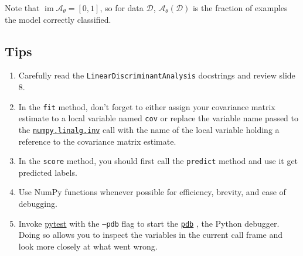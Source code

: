 \documentclass{article}
\numberwithin{equation}{section}
\newcommand{\pytest}{\href{https://docs.pytest.org/en/stable/}{pytest}}
\newcommand{\npinv}{%
    \href{%
        https://numpy.org/doc/stable/reference/generated/numpy.linalg.inv.html%
    }{\texttt{numpy.linalg.inv}}%
}
\newcommand{\pdb}{%
    \href{https://docs.python.org/3/library/pdb.html}{\texttt{pdb}}%
}
\begin{document}
Note that $ \operatorname{im}\mathcal{A}_\theta = [0, 1] $, so for
data $ \mathcal{D} $, $ \mathcal{A}_\theta(\mathcal{D}) $ is the
fraction of examples the model correctly classified.

\subsection{Tips}

\begin{enumerate}
    \item
    Carefully read the \texttt{LinearDiscriminantAnalysis} docstrings and
    review slide 8.

    \item
    In the \texttt{fit} method, don't forget to either assign your covariance
    matrix estimate to a local variable named \texttt{cov} or replace the
    variable name passed to the \npinv{} call with the name of the local
    variable holding a reference to the covariance matrix estimate.

    \item
    In the \texttt{score} method, you should first call the \texttt{predict}
    method and use it get predicted labels.    

    \item
    Use NumPy functions whenever possible for efficiency, brevity, and ease
    of debugging.

    \item
    Invoke \pytest{} with the \texttt{--pdb} flag to start the \pdb, the
    Python debugger. Doing so allows you to inspect the variables in the
    current call frame and look more closely at what went wrong.
\end{enumerate}
\end{document}
